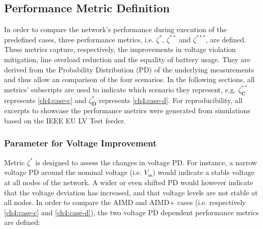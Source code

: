 \subsection{Performance Metric Definition}
\label{ch4:subsec:performance-metric-definition}

In order to compare the network's performance during execution of the predefined cases, three performance metrics, i.e. $\zeta^{*}$, $\zeta^{**}$ and $\zeta^{***}$, are defined.
These metrics capture, respectively, the improvements in voltage violation mitigation, line overload reduction and the equality of battery usage.
They are derived from the Probability Distribution (PD) of the underlying measurements and thus allow an comparison of the four scenarios.
In the following sections, all metrics' subscripts are used to indicate which scenario they represent, e.g. $\zeta_\textbf{C}^{**}$ represents \ref{ch4:case-c} and $\zeta_\textbf{D}^{*}$ represents \ref{ch4:case-d}.
For reproducibility, all excerpts to showcase the performance metrics were generated from simulations based on the IEEE EU LV Test feeder.

\subsubsection{Parameter for Voltage Improvement}

Metric $\zeta^{*}$ is designed to assess the changes in voltage PD.
For instance, a narrow voltage PD around the nominal voltage (i.e. $V_\text{ss}$) would indicate a stable voltage at all nodes of the network.
A wider or even shifted PD would however indicate that the voltage deviation has increased, and that voltage levels are not stable at all nodes.
In order to compare the AIMD and AIMD+ cases (i.e. respectively \ref{ch4:case-c} and \ref{ch4:case-d}), the two voltage PD dependent performance metrics are defined:


